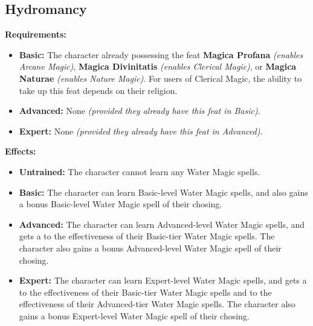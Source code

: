 \documentclass[openany,10pt,a4paper]{book}
\begin{document}
\begin{itemize}
\begin{itemize}
\begin{itemize}
\begin{itemize}
\subsection{Hydromancy}
\begin{table}[!ht]
\centering
{}
\end{table}
\textbf{Requirements:}
\begin{itemize}
	\item \textbf{Basic:} The character already possessing the feat \textbf{Magica Profana} \textit{(enables Arcane Magic)}, \textbf{Magica Divinitatis} \textit{(enables Clerical Magic)}, or \textbf{Magica Naturae} \textit{(enables Nature Magic)}. For users of Clerical Magic, the ability to take up this feat depends on their religion.
	\item \textbf{Advanced:} None \textit{(provided they already have this feat in Basic)}.
	\item \textbf{Expert:} None \textit{(provided they already have this feat in Advanced)}.
\end{itemize}
\textbf{Effects:}
\begin{itemize}
	\item \textbf{Untrained:} The character cannot learn any Water Magic spells.
	\item \textbf{Basic:} The character can learn Basic-level Water Magic spells, and also gains a bonus Basic-level Water Magic spell of their chosing.
	\item \textbf{Advanced:} The character can learn Advanced-level Water Magic spells, and gets a  to the effectiveness of their Basic-tier Water Magic spells. The character also gains a bonus Advanced-level Water Magic spell of their chosing.
	\item \textbf{Expert:} The character can learn Expert-level Water Magic spells, and gets a  to the effectiveness of their Basic-tier Water Magic spells and  to the effectiveness of their Advanced-tier Water Magic spells. The character also gains a bonus Expert-level Water Magic spell of their chosing.
\end{itemize}\newpage

\end{itemize}
\end{itemize}
\end{itemize}
\end{itemize}
\end{document}
